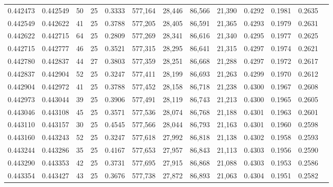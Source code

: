 \begin{tabular}{rrrrrrrrrrrrr}
0.442473 & 0.442549 &    50 &  25 &                                     0.3333 & 577,164 &  28,446 &  86,566 &  21,390 & 0.4292 & 0.1981 & 0.2635 \\
0.442549 & 0.442622 &    41 &  25 &                                     0.3788 & 577,205 &  28,405 &  86,591 &  21,365 & 0.4293 & 0.1979 & 0.2631 \\
0.442622 & 0.442715 &    64 &  25 &                                     0.2809 & 577,269 &  28,341 &  86,616 &  21,340 & 0.4295 & 0.1977 & 0.2625 \\
0.442715 & 0.442777 &    46 &  25 &                                     0.3521 & 577,315 &  28,295 &  86,641 &  21,315 & 0.4297 & 0.1974 & 0.2621 \\
0.442780 & 0.442837 &    44 &  27 &                                     0.3803 & 577,359 &  28,251 &  86,668 &  21,288 & 0.4297 & 0.1972 & 0.2617 \\
0.442837 & 0.442904 &    52 &  25 &                                     0.3247 & 577,411 &  28,199 &  86,693 &  21,263 & 0.4299 & 0.1970 & 0.2612 \\
0.442904 & 0.442972 &    41 &  25 &                                     0.3788 & 577,452 &  28,158 &  86,718 &  21,238 & 0.4300 & 0.1967 & 0.2608 \\
0.442973 & 0.443044 &    39 &  25 &                                     0.3906 & 577,491 &  28,119 &  86,743 &  21,213 & 0.4300 & 0.1965 & 0.2605 \\
0.443046 & 0.443108 &    45 &  25 &                                     0.3571 & 577,536 &  28,074 &  86,768 &  21,188 & 0.4301 & 0.1963 & 0.2601 \\
0.443110 & 0.443157 &    30 &  25 &                                     0.4545 & 577,566 &  28,044 &  86,793 &  21,163 & 0.4301 & 0.1960 & 0.2598 \\
0.443160 & 0.443243 &    52 &  25 &                                     0.3247 & 577,618 &  27,992 &  86,818 &  21,138 & 0.4302 & 0.1958 & 0.2593 \\
0.443244 & 0.443286 &    35 &  25 &                                     0.4167 & 577,653 &  27,957 &  86,843 &  21,113 & 0.4303 & 0.1956 & 0.2590 \\
0.443290 & 0.443353 &    42 &  25 &                                     0.3731 & 577,695 &  27,915 &  86,868 &  21,088 & 0.4303 & 0.1953 & 0.2586 \\
0.443354 & 0.443427 &    43 &  25 &                                     0.3676 & 577,738 &  27,872 &  86,893 &  21,063 & 0.4304 & 0.1951 & 0.2582 \\

\end{tabular}
